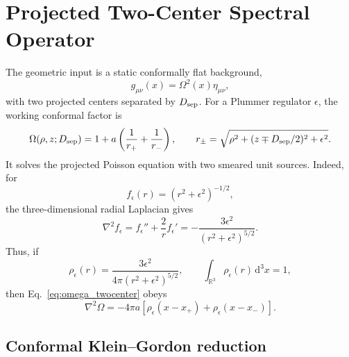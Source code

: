 \documentclass[11pt,a4paper]{article}
\newcommand{\dd}{\mathrm{d}}
\newcommand{\Dsep}{D_{\rm sep}}
\begin{document}
\section{Projected Two-Center Spectral Operator}
\label{sec:operator}

The geometric input is a static conformally flat background,
\begin{equation}
    g_{\mu\nu}(x)=\Omega^2(x)\eta_{\mu\nu},
\end{equation}
with two projected centers separated by \(\Dsep\).
For a Plummer regulator \(\epsilon\), the working conformal factor is
\begin{equation}
    \Omega(\rho,z;\Dsep)=1+a\left(\frac{1}{r_+}+\frac{1}{r_-}\right),\qquad
    r_\pm=\sqrt{\rho^2+(z\mp \Dsep/2)^2+\epsilon^2}.
    \label{eq:omega_twocenter}
\end{equation}
It solves the projected Poisson equation with two smeared unit sources.
Indeed, for
\begin{equation}
    f_\epsilon(r)=(r^2+\epsilon^2)^{-1/2},
\end{equation}
the three-dimensional radial Laplacian gives
\begin{equation}
    \nabla^2 f_\epsilon
    =f_\epsilon''+\frac{2}{r}f_\epsilon'
    =-\frac{3\epsilon^2}{(r^2+\epsilon^2)^{5/2}}.
    \label{eq:plummer_laplacian}
\end{equation}
Thus, if
\begin{equation}
    \rho_\epsilon(r)=\frac{3\epsilon^2}{4\pi(r^2+\epsilon^2)^{5/2}},
    \qquad
    \int_{\mathbb R^3}\rho_\epsilon(r)\,\dd^3x=1,
\end{equation}
then Eq.~\eqref{eq:omega_twocenter} obeys
\begin{equation}
    \nabla^2\Omega
    =
    -4\pi a\left[
        \rho_\epsilon(x-x_+)+\rho_\epsilon(x-x_-)
    \right].
    \label{eq:projected_poisson}
\end{equation}

\subsection{Conformal Klein--Gordon reduction}
\end{document}
